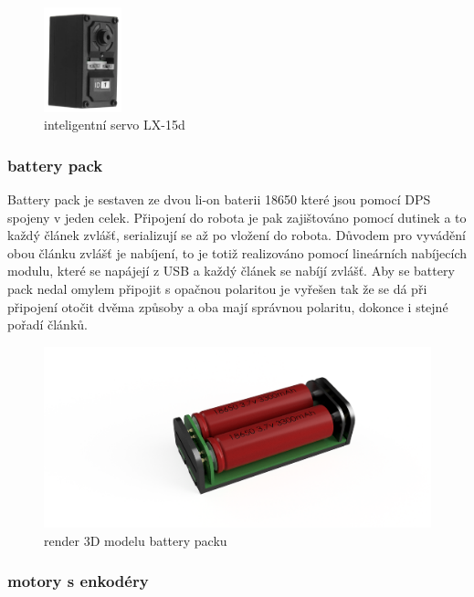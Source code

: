 \documentclass{template/socthesis}
\begin{document}
\begin{figure}[h]
	
	\centering
	\includegraphics[width=0.2\textwidth]{img/LX-15d.png}
	\caption{inteligentní servo LX-15d}
	
\end{figure}

\newpage

\subsubsection{battery pack}

Battery pack je sestaven ze dvou li-on baterii 18650 které jsou pomocí DPS spojeny v jeden celek. Připojení do robota je pak zajištováno pomocí dutinek a to každý článek zvlášť, serializují se až po vložení do robota. Důvodem pro vyvádění obou článku zvlášť je nabíjení, to je totiž realizováno pomocí lineárních nabíjecích modulu, které se napájejí z USB a každý článek se nabíjí zvlášť.
Aby se battery pack nedal omylem připojit s opačnou polaritou je vyřešen tak že se dá při připojení otočit dvěma způsoby a oba mají správnou polaritu, dokonce i stejné pořadí článků.

\begin{figure}[h]
	\centering
	\includegraphics[width=1\textwidth]{img/battery_pack_v3.png}
	\caption{render 3D modelu battery packu}
\end{figure}

\subsubsection{motory s enkodéry}
\end{document}
